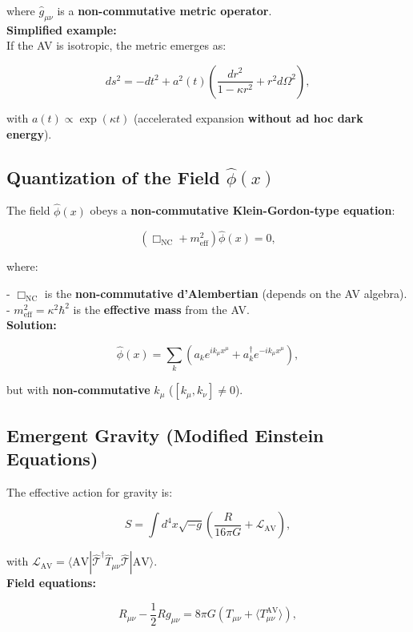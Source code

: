 \documentclass[a4paper]{article}
\theoremstyle{definition}
\theoremstyle{remark}
\numberwithin{equation}{section}
\begin{document}
where \(\hat{g}_{\mu\nu}\) is a \textbf{non-commutative metric operator}.\\

\textbf{Simplified example:}\\
If the AV is isotropic, the metric emerges as:

\[
ds^2 = -dt^2 + a^2(t) \left( \frac{dr^2}{1 - \kappa r^2} + r^2 d\Omega^2 \right),
\]

with \(a(t) \propto \exp(\kappa t)\) (accelerated expansion \textbf{without ad hoc dark energy}).

\subsection{Quantization of the Field \(\hat{\phi}(x)\)}

The field \(\hat{\phi}(x)\) obeys a \textbf{non-commutative Klein-Gordon-type equation}:

\[
\left( \Box_{\text{NC}} + m^2_{\text{eff}} \right) \hat{\phi}(x) = 0,
\]

where:

- \(\Box_{\text{NC}}\) is the \textbf{non-commutative d'Alembertian} (depends on the AV algebra).\\
- \(m^2_{\text{eff}} = \kappa^2 \hbar^2\) is the \textbf{effective mass} from the AV.\\

\textbf{Solution:}

\[
\hat{\phi}(x) = \sum_k \left( a_k e^{i k_\mu x^\mu} + a_k^\dagger e^{-i k_\mu x^\mu} \right),
\]

but with \textbf{non-commutative} \(k_\mu\) (\([k_\mu, k_\nu] \neq 0\)).

\subsection{Emergent Gravity (Modified Einstein Equations)}

The effective action for gravity is:

\[
S = \int d^4x \sqrt{-g} \left( \frac{R}{16\pi G} + \mathcal{L}_{\text{AV}} \right),
\]

with \(\mathcal{L}_{\text{AV}} = \langle \text{AV} | \hat{\mathcal{T}}^\dagger \hat{T}_{\mu\nu} \hat{\mathcal{T}} | \text{AV} \rangle\).\\

\textbf{Field equations:}

\[
R_{\mu\nu} - \frac{1}{2} R g_{\mu\nu} = 8\pi G \left( T_{\mu\nu} + \langle T^{\text{AV}}_{\mu\nu} \rangle \right),
\]
\end{document}

